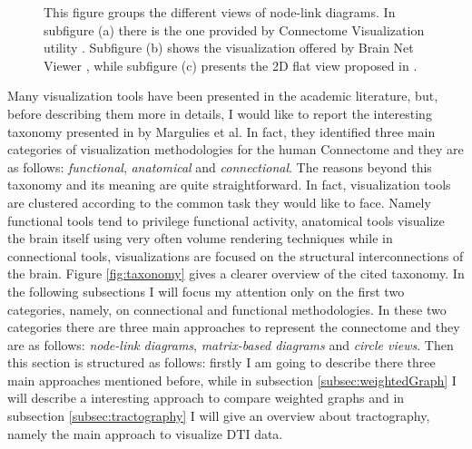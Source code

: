 \documentclass{article}
\begin{document}
\begin{multicols}{2}
\begin{figure}[ht]
	\caption{This figure groups the different views of node-link diagrams. In subfigure (a) there is the one provided by Connectome Visualization utility \cite{connectomeVisualizationUtility}. Subfigure (b) shows the visualization offered by Brain Net Viewer \cite{brainNetViewer}, while subfigure (c) presents the 2D flat view proposed in \cite{salvador2005undirected}.}
\end{figure}


Many visualization tools have been presented in the academic literature, but, before describing them more in details, I would like to report the interesting taxonomy presented in \cite{visualizingHumanConnectome} by Margulies et al. In fact, they identified three main categories of visualization methodologies for the human Connectome and they are as follows: \textit{functional}, \textit{anatomical} and \textit{connectional}. The reasons beyond this taxonomy and its meaning are quite straightforward. In fact, visualization tools are clustered according to the common task they would like to face. Namely functional tools tend to privilege functional activity, anatomical tools visualize the brain itself using very often volume rendering techniques while in connectional tools, visualizations are focused on the structural interconnections of the brain. Figure \ref{fig:taxonomy} gives a clearer overview of the cited taxonomy. In the following subsections I will focus my attention only on the first two categories, namely, on connectional and functional methodologies. In these two categories there are three main approaches to represent the connectome and they are as follows: \textit{node-link diagrams}, \textit{matrix-based diagrams} and \textit{circle views}. Then this section is structured as follows: firstly I am going to describe there three main approaches mentioned before, while in subsection \ref{subsec:weightedGraph} I will describe a interesting approach to compare weighted graphs and in subsection \ref{subsec:tractography} I will give an overview about tractography, namely the main approach to visualize DTI data.



\end{multicols}
\end{document}
